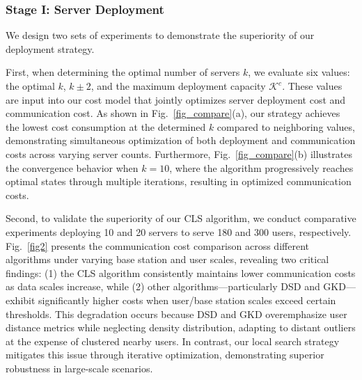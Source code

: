 \documentclass[10pt, conference, letterpaper]{IEEEtran}
\begin{document}
\subsubsection{Stage I: Server Deployment}
We design two sets of experiments to demonstrate the superiority of our deployment strategy. 

First, when determining the optimal number of servers $k$, we evaluate six values: the optimal $k$, $k \pm 2$, and the maximum deployment capacity $\mathcal{K}^c$. These values are input into our cost model that jointly optimizes server deployment cost and communication cost. As shown in Fig.~\ref{fig_compare}(a), our strategy achieves the lowest cost consumption at the determined $k$ compared to neighboring values, demonstrating simultaneous optimization of both deployment and communication costs across varying server counts. Furthermore, Fig.~\ref{fig_compare}(b) illustrates the convergence behavior when $k=10$, where the algorithm progressively reaches optimal states through multiple iterations, resulting in optimized communication costs.

Second, to validate the superiority of our CLS algorithm, we conduct comparative experiments deploying 10 and 20 servers to serve 180 and 300 users, respectively. Fig.~\ref{fig2} presents the communication cost comparison across different algorithms under varying base station and user scales, revealing two critical findings: (1) the CLS algorithm consistently maintains lower communication costs as data scales increase, while (2) other algorithms—particularly DSD and GKD—exhibit significantly higher costs when user/base station scales exceed certain thresholds. This degradation occurs because DSD and GKD overemphasize user distance metrics while neglecting density distribution, adapting to distant outliers at the expense of clustered nearby users. In contrast, our local search strategy mitigates this issue through iterative optimization, demonstrating superior robustness in large-scale scenarios.
\end{document}
